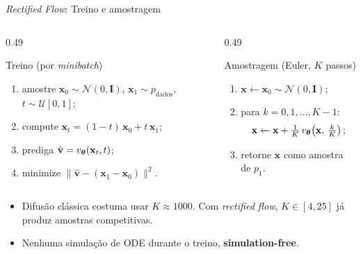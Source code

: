 \documentclass[aspectratio=169,xcolor=dvipsnames]{beamer}
\begin{document}
  \begin{frame}{\textit{Rectified Flow}: Treino e amostragem}
    \begin{columns}[T]
      \begin{column}{0.49\textwidth}
        \begin{block}{Treino (por \textit{minibatch})}
          \footnotesize
          \begin{enumerate}
            \item amostre
            $\mathbf{x}_0 \sim \mathcal{N}(0, \mathbf{I})$,
            $\mathbf{x}_1 \sim p_{\text{dados}}$,
            $t \sim \mathcal{U}[0,1]$;
            \item compute
            $\mathbf{x}_t = (1-t)\,\mathbf{x}_0 + t\,\mathbf{x}_1$;
            \item prediga
            $\hat{\mathbf{v}} = v_{\bm{\theta}}(\mathbf{x}_t, t)$;
            \item minimize
            $\|\hat{\mathbf{v}} - (\mathbf{x}_1 - \mathbf{x}_0)\|^{2}$.
          \end{enumerate}
        \end{block}
      \end{column}
      \begin{column}{0.49\textwidth}
        \begin{block}{Amostragem (Euler, $K$ passos)}
          \footnotesize
          \begin{enumerate}
            \item $\mathbf{x} \leftarrow \mathbf{x}_0 \sim
            \mathcal{N}(0, \mathbf{I})$;
            \item para $k = 0, 1, \dots, K-1$:
            \[
              \mathbf{x} \leftarrow \mathbf{x} + \tfrac{1}{K}\,
              v_{\bm{\theta}}\!\left(\mathbf{x},\, \tfrac{k}{K}\right);
            \]
            \item retorne $\mathbf{x}$ como amostra de $p_1$.
          \end{enumerate}
        \end{block}
      \end{column}
    \end{columns}
    \vspace{0.4em}
    \begin{itemize}
      \item Difusão clássica costuma usar $K \approx 1000$. Com
      \textit{rectified flow}, $K \in [4, 25]$ já produz amostras
      competitivas.
      \item Nenhuma simulação de ODE durante o treino,
      \textbf{simulation-free}.
    \end{itemize}
  \end{frame}
\end{document}
